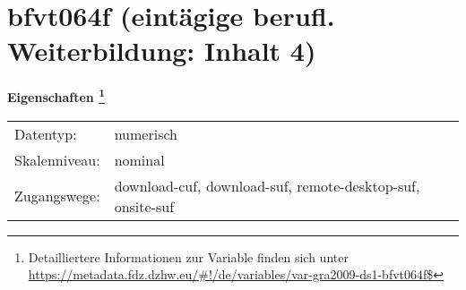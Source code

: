 
    \setcounter{footnote}{0}

    \vspace*{-1.8cm}
	\section{bfvt064f (eintägige berufl. Weiterbildung: Inhalt 4)}
	\label{section:bfvt064f}



    \vspace*{0.5cm}
    \noindent\textbf{Eigenschaften
	\footnote{Detailliertere Informationen zur Variable finden sich unter
		\url{https://metadata.fdz.dzhw.eu/\#!/de/variables/var-gra2009-ds1-bfvt064f$}}}\\
	\begin{tabularx}{\hsize}{@{}lX}
	Datentyp: & numerisch \\
	Skalenniveau: & nominal \\
	Zugangswege: &
	  download-cuf, 
	  download-suf, 
	  remote-desktop-suf, 
	  onsite-suf
 \\
    \end{tabularx}



